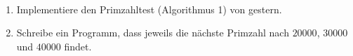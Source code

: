 \begin{aufg}~
\begin{enumerate}
\item Implementiere den Primzahltest (Algorithmus 1) von gestern.
\item Schreibe ein Programm, dass jeweils die nächste Primzahl nach $20000$, $30000$ und $40000$ findet.
\end{enumerate}
\end{aufg}
